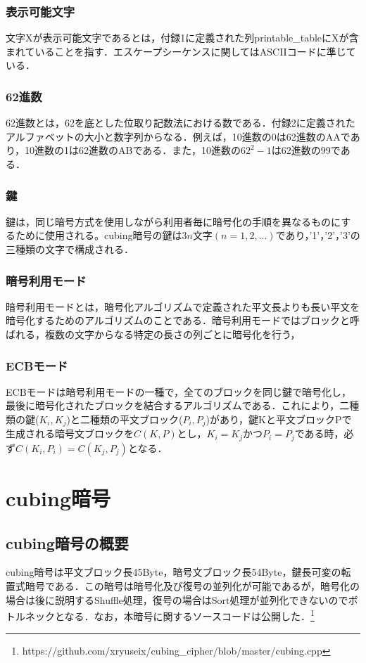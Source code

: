 \documentclass[titlepage]{jarticle}
\begin{document}
\subsubsection{表示可能文字}
文字Xが表示可能文字であるとは，付録1に定義された列printable\_tableにXが含まれていることを指す．エスケープシーケンスに関してはASCIIコードに準じている．

\subsubsection{62進数}
62進数とは，62を底とした位取り記数法における数である．付録2に定義されたアルファベットの大小と数字列からなる．例えば，10進数の0は62進数のAAであり，10進数の1は62進数のABである．また，10進数の\(62^2-1\)は62進数の99である．

\subsubsection{鍵}
鍵は，同じ暗号方式を使用しながら利用者毎に暗号化の手順を異なるものにするために使用される。cubing暗号の鍵は\(3n\)文字\((n=1,2,...)\)であり，'1'，'2'，'3'の三種類の文字で構成される．

\subsubsection{暗号利用モード}
暗号利用モードとは，暗号化アルゴリズムで定義された平文長よりも長い平文を暗号化するためのアルゴリズムのことである．暗号利用モードではブロックと呼ばれる，複数の文字からなる特定の長さの列ごとに暗号化を行う，

\subsubsection{ECBモード}
ECBモードは暗号利用モードの一種で，全てのブロックを同じ鍵で暗号化し，最後に暗号化されたブロックを結合するアルゴリズムである．これにより，二種類の鍵(\(K_i,K_j\))と二種類の平文ブロック(\(P_i,P_j\))があり，鍵Kと平文ブロックPで生成される暗号文ブロックを\(C(K,P)\)とし，\(K_i=K_j\)かつ\(P_i=P_j\)である時，必ず\(C(K_i,P_i)=C(K_j,P_j)\)となる．

\section{cubing暗号}
\subsection{cubing暗号の概要}
cubing暗号は平文ブロック長45Byte，暗号文ブロック長54Byte，鍵長可変の転置式暗号である．この暗号は暗号化及び復号の並列化が可能であるが，暗号化の場合は後に説明するShuffle処理，復号の場合はSort処理が並列化できないのでボトルネックとなる．なお，本暗号に関するソースコードは公開した．\footnote{https://github.com/xryuseix/cubing\_cipher/blob/master/cubing.cpp}
\end{document}

